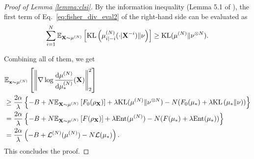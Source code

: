 \begin{proof}[Proof of Lemma \ref{lemma:clsi}]
    By the information inequality (Lemma 5.1 of \citet{chen2022uniform}), the first term of Eq.~\eqref{eq:fisher_div_eval2} of the right-hand side can be evaluated as 
    \begin{align}
        \sum_{i=1}^N \bE_{\vX \sim \pow[\mu,N]}\left[ \KL\left(\pow[\mu,N]_{i|-i}(\cdot|\vX^{-i} )\| \nu \right) \right] 
        \geq \KL(\pow[\mu,N] \| \tensor[\nu,N]).
    \end{align}
    
    Combining all of them, we get
    \begin{align*}
        &\bE_{\vx \sim \pow[\mu,N]}\left[ \left\| \nabla \log \frac{\rd \pow[\mu,N]}{\rd \pow[\mu,N]_*}(\vX) \right\|_2^2\right] \\
        &\geq \frac{2\alpha}{\lambda} \left\{ - B + N \bE_{\vX \sim \pow[\mu,N]} \left[ F_0(\rho_\vX) \right] + \lambda \KL(\pow[\mu,N] \| \tensor[\nu,N]) 
        - N(F_0(\mu_*) + \lambda \KL\left(\mu_* \| \nu\right)) \right\} \\
        &= \frac{2\alpha}{\lambda} \left\{ - B + N \bE_{\vX \sim \pow[\mu,N]} \left[ F(\rho_\vX) \right] + \lambda \Ent(\pow[\mu,N]) - N(F(\mu_*) +\lambda\Ent(\mu_*)) \right\} \\
        &= \frac{2\alpha}{\lambda} \left( - B + \pow[\cL,N](\pow[\mu,N]) - N \cL(\mu_*) \right).
    \end{align*}
    This concludes the proof.
\end{proof}

